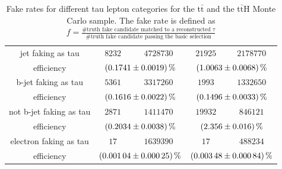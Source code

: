 \begin{table}
\begin{tabular*}{\linewidth}{@{\extracolsep{\fill}}ccccc}
		jet faking as tau            & $8232$         & $4728730$      & $21925$         & $2178770$ 
		\\
		efficiency                  & \multicolumn{2}{c}{$\SI{0.1741\pm 0.0019}{\percent}$}   & \multicolumn{2}{c}{$\SI{1.0063\pm 0.0068}{\percent}$}
		\\
		\hline
		b-jet faking as tau          & $5361$        & $3317260$      & $1993$         & $1332650$ 
		\\
		efficiency                  & \multicolumn{2}{c}{$\SI{0.1616\pm 0.0022}{\percent}$}   & \multicolumn{2}{c}{$\SI{0.1496\pm 0.0033}{\percent}$}
		\\
		\hline
                not b-jet faking as tau          & $2871$        & $1411470$      & $19932$         & $846121$ 
		\\
		efficiency                  & \multicolumn{2}{c}{$\SI{0.2034\pm 0.0038}{\percent}$}   & \multicolumn{2}{c}{$\SI{2.356\pm 0.016}{\percent}$}
		\\
                \hline
                electron faking as tau          & $17$        & $1639390$      & $17$         & $488234$ 
		\\
		efficiency                  & \multicolumn{2}{c}{$\SI{0.00104\pm 0.00025}{\percent}$}   & \multicolumn{2}{c}{$\SI{0.00348\pm 0.00084}{\percent}$}
		\\
		\hline
		\hline
		\end{tabular*}
		\caption[Fake rates for the t$\bar{\text{t}}$ and the t$\bar{\text{t}}$H sample.]{Fake rates for different tau lepton categories for the t$\bar{\text{t}}$ and the t$\bar{\text{t}}$H Monte Carlo sample. The fake rate is defined as $f=\frac{\text{\#truth fake candidate matched to a reconstructed }\tau}{\text{\#truth fake candidate passing the basic selection}}$}
		\label{ttbarttHfakeTable}
          \renewcommand{\arraystretch}{1}
\end{table}
